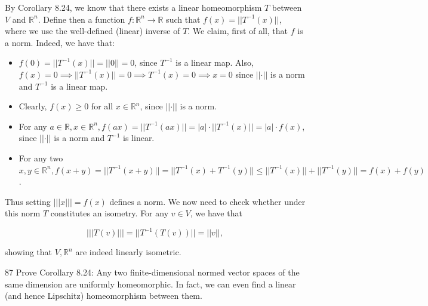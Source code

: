 \begin{solution}
    
    By Corollary 8.24, we know that there exists a linear homeomorphism $T$ between $V$ and $\mathbb{R}^n$.
    Define then a function $f: \mathbb{R}^n \rightarrow \mathbb{R}$ such that $f(x) = \lvert \lvert T^{-1}(x) \rvert \rvert$, where we use the well-defined (linear) inverse of $T$.
    We claim, first of all, that $f$ is a norm.
    Indeed, we have that:
    \begin{itemize}
        \item $f(0) = \lvert \lvert T^{-1}(x) \rvert \rvert = \lvert \lvert 0 \rvert \rvert = 0$, since $T^{-1}$ is a linear map.
        Also, $f(x) = 0 \implies \lvert \lvert T^{-1}(x) \rvert \rvert = 0 \implies T^{-1}(x) = 0 \implies x = 0$ since $\lvert \lvert \cdot \rvert \rvert$ is a norm and $T^{-1}$ is a linear map.
        \item Clearly, $f(x) \geq 0$ for all $x \in \mathbb{R}^n$, since $\lvert \lvert \cdot \rvert \rvert$ is a norm.
        \item For any $a \in \mathbb{R}, x \in \mathbb{R}^n, f(ax) = \lvert \lvert T^{-1}(ax) \rvert \rvert = \lvert a \rvert \cdot \lvert \lvert T^{-1}(x) \rvert \rvert = \lvert a \rvert \cdot f(x)$, since $\lvert \lvert \cdot \rvert \rvert$ is a norm and $T^{-1}$ is linear.
        \item For any two $x, y \in \mathbb{R}^n, f(x + y) = \lvert \lvert T^{-1}(x + y) \rvert \rvert = \lvert \lvert T^{-1}(x) + T^{-1}(y) \rvert \rvert \leq \lvert \lvert T^{-1}(x) \rvert \rvert + \lvert \lvert T^{-1}(y) \rvert \rvert = f(x) + f(y)$.
    \end{itemize}
    Thus setting $\lvert \lvert \lvert x \rvert \rvert \rvert = f(x)$ defines a norm.
    We now need to check whether under this norm $T$ constitutes an isometry.
    For any $v \in V$, we have that

    \[\lvert \lvert \lvert T(v) \rvert \rvert \rvert = \lvert \lvert T^{-1}(T(v)) \rvert \rvert = \lvert \lvert v \rvert \rvert,\]

    showing that $V, \mathbb{R}^n$ are indeed linearly isometric.
\end{solution}

\newpage

\begin{exercise}{87}
    Prove Corollary 8.24: Any two finite-dimensional normed vector spaces of the same dimension are uniformly homeomorphic.
    In fact, we can even find a linear (and hence Lipschitz) homeomorphism between them.
\end{exercise}

